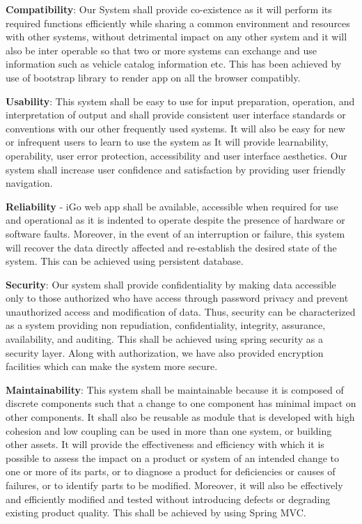 \documentclass[11pt, english]{report}
\begin{document}
\begin{enumerate}
    \item{\textbf{Compatibility}: Our System shall provide co-existence as it will perform its required functions efficiently while sharing a common environment and resources with other systems, without detrimental impact on any other system and it will also be inter operable so that two or more systems can exchange and use information such as vehicle catalog information etc. This has been achieved by use of bootstrap library to render app on all the browser compatibly.} 
    \item{\textbf{Usability}: This system shall be easy to use for input preparation, operation, and interpretation of output and shall provide consistent user interface standards or conventions with our other frequently used systems. It will also be easy for new or infrequent users to learn to use the system as It will provide learnability, operability, user error protection, accessibility and user interface aesthetics. Our system shall increase user confidence and satisfaction by providing user friendly navigation.
    
    \item{\textbf{Reliability} - iGo web app shall be available, accessible when required for use and operational as it is indented to operate despite the presence of hardware or software faults. Moreover, in the event of an interruption or failure, this system will recover the data directly affected and re-establish the desired state of the system. This can be achieved using persistent database.}
    
    \item{\textbf{Security}: Our system shall provide confidentiality by making data accessible only to those authorized who have access through password privacy and prevent unauthorized access and modification of data. Thus, security can be characterized as a system providing non repudiation, confidentiality, integrity, assurance, availability, and auditing. This shall be achieved using spring security as a security layer. Along with authorization, we have also provided encryption facilities which can make the system more secure.}
    
    \item{\textbf{Maintainability}: This system shall be maintainable because it is composed of discrete components such that a change to one component has minimal impact on other components. It shall also be reusable as module that is developed with high cohesion and low coupling can be used in more than one system, or building other assets. It will provide the effectiveness and efficiency with which it is possible to assess the impact on a product or system of an intended change to one or more of its parts, or to diagnose a product for deficiencies or causes of failures, or to identify parts to be modified. Moreover, it will also be effectively and efficiently modified and tested without introducing defects or degrading existing product quality. This shall be achieved by using Spring MVC.}
    
}
\end{enumerate}
\end{document}

